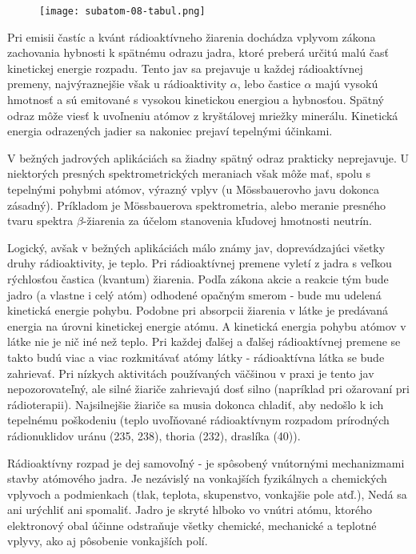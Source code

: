 \documentclass[../../main.tex]{subfiles}
\begin{document}
\begin{figure}[!h]
\texttt{[image: subatom-08-tabul.png]}
\centering
\label{sf8:fig:tabul}
\end{figure}

Pri emisii častíc a kvánt rádioaktívneho žiarenia dochádza vplyvom zákona zachovania hybnosti k spätnému odrazu jadra, ktoré preberá určitú malú časť kinetickej energie rozpadu. Tento jav sa prejavuje u každej rádioaktívnej premeny, najvýraznejšie však u rádioaktivity $\alpha$, lebo častice $\alpha$ majú vysokú hmotnosť a sú emitované s vysokou kinetickou energiou a hybnosťou. Spätný odraz môže viesť k uvoľneniu atómov z kryštálovej mriežky minerálu. Kinetická energia odrazených jadier sa nakoniec prejaví tepelnými účinkami.

V bežných jadrových aplikáciách sa žiadny spätný odraz prakticky neprejavuje.
U niektorých presných spektrometrických meraniach však môže mať, spolu s tepelnými pohybmi atómov, výrazný vplyv (u Mössbauerovho javu dokonca zásadný). Príkladom je Mössbauerova spektrometria, alebo meranie presného tvaru spektra $\beta$-žiarenia za účelom stanovenia kľudovej hmotnosti neutrín.

Logický, avšak v bežných aplikáciách málo známy jav, doprevádzajúci všetky druhy rádioaktivity, je teplo. Pri rádioaktívnej premene vyletí z jadra s veľkou rýchlosťou častica (kvantum) žiarenia. Podľa zákona akcie a reakcie tým bude jadro (a vlastne i celý atóm) odhodené opačným smerom - bude mu udelená kinetická energie pohybu. Podobne pri absorpcii žiarenia v látke je predávaná energia na úrovni kinetickej energie atómu. A kinetická energia pohybu atómov v látke nie je nič iné než teplo. Pri každej ďalšej a ďalšej rádioaktívnej premene se takto budú viac a viac rozkmitávať atómy látky - rádioaktívna látka se bude zahrievať. Pri nízkych aktivitách používaných väčšinou v praxi je tento jav nepozorovateľný, ale silné žiariče zahrievajú dosť silno (napríklad pri ožarovaní pri rádioterapii). Najsilnejšie žiariče sa musia dokonca chladiť, aby nedošlo k ich tepelnému poškodeniu (teplo uvoľňované rádioaktívnym rozpadom prírodných rádionuklidov uránu (235, 238), thoria (232), draslíka (40)).

Rádioaktívny rozpad je dej samovoľný - je spôsobený vnútornými mechanizmami stavby atómového jadra. Je nezávislý na vonkajších fyzikálnych a chemických vplyvoch a podmienkach (tlak, teplota, skupenstvo, vonkajšie pole atď.), Nedá sa ani urýchliť ani spomaliť. Jadro je skryté hlboko vo vnútri atómu, ktorého elektronový obal účinne odstraňuje všetky chemické, mechanické a teplotné vplyvy, ako aj pôsobenie vonkajších polí.
\end{document}
